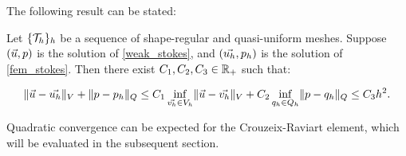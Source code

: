 The following result can be stated:

\begin{proposition} \label{convergence}
    Let $\{\mathcal{T}_h\}_h$ be a sequence of shape-regular and quasi-uniform meshes. Suppose $(\vec{u}, p)$ is the solution of \eqref{weak_stokes}, and $(\vec{u_h}, p_h)$ is the solution of \eqref{fem_stokes}. Then there exist $C_1, C_2, C_3 \in \mathbb{R}_+$ such that:

    \begin{gather}
        \lVert \vec{u} - \vec{u_h} \rVert_V + \lVert p - p_h \rVert_Q \leq C_1 \inf_{\vec{v_h} \in V_h} \lVert \vec{u} - \vec{v_h} \rVert_V + C_2 \inf_{q_h \in Q_h} \lVert p - q_h \rVert_Q \leq C_3 h^2.
    \end{gather}
\end{proposition}

Quadratic convergence can be expected for the Crouzeix-Raviart element, which will be evaluated in the subsequent section.